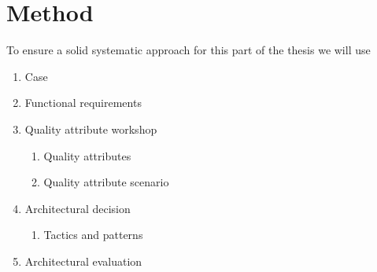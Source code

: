 \section{Method}
To ensure a solid systematic approach for this part of the thesis we will use   


\begin{enumerate}
    \item Case
    \item Functional requirements
    \item Quality attribute workshop
        \begin{enumerate}
            \item Quality attributes
            \item Quality attribute scenario
        \end{enumerate}
    \item Architectural decision
       \begin{enumerate}
            \item Tactics and patterns
        \end{enumerate}
    \item Architectural evaluation
\end{enumerate}


